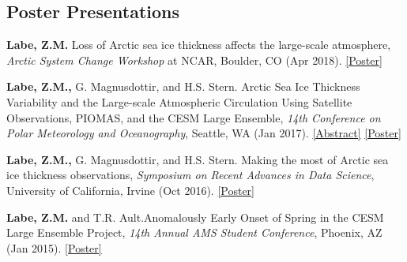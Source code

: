 \documentclass[margin,line,palatino,courier,10pt]{res}
\begin{document}
\begin{resume}
\section{\sc \textcolor{Cerulean}{\large{\textbf{Poster Presentations}}}}
\begin{etaremune}[leftmargin=0in,topsep=0in,parsep=0in]
\item \textbf{Labe, Z.M.} Loss of Arctic sea ice thickness affects the large-scale atmosphere, \textit{Arctic System Change Workshop} at NCAR, Boulder, CO (Apr 2018). \href{https://sites.uci.edu/zlabe/files/2019/09/ZLabe_042018_BigIdeaPoster.pdf}{[Poster]}
\item \textbf{Labe, Z.M.,} G. Magnusdottir, and H.S. Stern. Arctic Sea Ice Thickness Variability and the Large-scale Atmospheric Circulation Using Satellite Observations, PIOMAS, and the CESM Large Ensemble, \textit{14th Conference on Polar Meteorology and Oceanography}, Seattle, WA (Jan 2017). \href{https://ams.confex.com/ams/97Annual/webprogram/Paper313445.html}{[Abstract]} \href{http://sites.uci.edu/zlabe/files/2017/01/ZLabeMagnusdottirStern_AMSposter_2017.pdf}{[Poster]}
\item \textbf{Labe, Z.M.,} G. Magnusdottir, and H.S. Stern. Making the most of Arctic sea ice thickness observations, \textit{Symposium on Recent Advances in Data Science}, University of California, Irvine (Oct 2016). \href{http://sites.uci.edu/zlabe/files/2016/10/ZLabeMagnusdottirStern_DSIposter_Oct16.pdf}{[Poster]}
\item \textbf{Labe, Z.M.} and T.R. Ault.\@ Anomalously Early Onset of Spring in the CESM Large Ensemble Project, \textit{14th Annual AMS Student Conference}, Phoenix, AZ (Jan 2015). \href{https://ams.confex.com/ams/95Annual/webprogram/Paper271063.html}{[Poster]}

\end{etaremune}


\end{resume}
\end{document}
